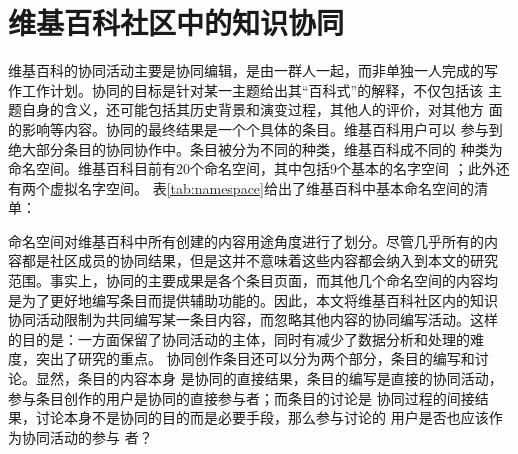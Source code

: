 \section{维基百科社区中的知识协同}


维基百科的协同活动主要是协同编辑，是由一群人一起，而非单独一人完成的写
作工作计划。协同的目标是针对某一主题给出其“百科式”的解释，不仅包括该
主题自身的含义，还可能包括其历史背景和演变过程，其他人的评价，对其他方
面的影响等内容。协同的最终结果是一个个具体的条目。维基百科用户可以
参与到绝大部分条目的协同协作中。条目被分为不同的种类，维基百科成不同的
种类为命名空间。维基百科目前有20个命名空间，其中包括9个基本的名字空间
；此外还有两个虚拟名字空间。
表\ref{tab:namespace}给出了维基百科中基本命名空间的清单：


命名空间对维基百科中所有创建的内容用途角度进行了划分。尽管几乎所有的内
容都是社区成员的协同结果，但是这并不意味着这些内容都会纳入到本文的研究
范围。事实上，协同的主要成果是各个条目页面，而其他几个命名空间的内容均
是为了更好地编写条目而提供辅助功能的。因此，本文将维基百科社区内的知识
协同活动限制为共同编写某一条目内容，而忽略其他内容的协同编写活动。这样
的目的是：一方面保留了协同活动的主体，同时有减少了数据分析和处理的难
度，突出了研究的重点。
协同创作条目还可以分为两个部分，条目的编写和讨论。显然，条目的内容本身
是协同的直接结果，条目的编写是直接的协同活动，参与条目创作的用户是协同的直接参与者；而条目的讨论是
协同过程的间接结果，讨论本身不是协同的目的而是必要手段，那么参与讨论的
用户是否也应该作为协同活动的参与
者？

